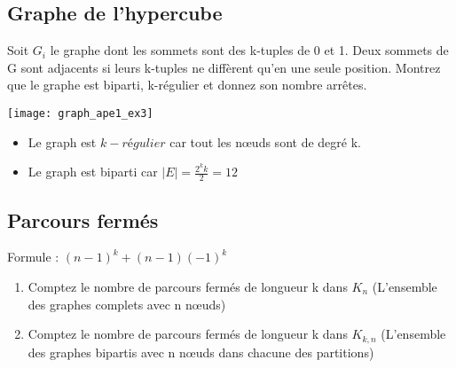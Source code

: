 \subsection{Graphe de l'hypercube}
Soit $G_{i}$ le graphe dont les sommets sont des k-tuples de 0 et 1. Deux sommets de G sont adjacents si leurs k-tuples ne diffèrent qu'en une seule position. Montrez que le graphe est biparti, k-régulier et donnez son nombre arrêtes.\\

\begin{solution}
\begin{minipage}{0.35\textwidth}
\begin{flushleft}
\texttt{[image: graph\_ape1\_ex3]}
\end{flushleft}
\end{minipage}
\begin{minipage}{0.65\textwidth}
\begin{flushright}
\begin{itemize}
\item Le graph est $k-régulier$ car tout les nœuds sont de degré k.
\item Le graph est biparti car $|E| = \frac{2^{k} k}{2} = 12$
\end{itemize}
\end{flushright}
\end{minipage}
\end{solution}

\subsection{Parcours fermés}
Formule : $(n-1)^{k} + (n-1)(-1)^{k}$
\begin{enumerate}
\item{Comptez le nombre de parcours fermés de longueur k dans $K_{n}$ (L'ensemble des graphes complets avec n nœuds)}
\item{Comptez le nombre de parcours fermés de longueur k dans $K_{k,n}$ (L'ensemble des graphes bipartis avec n nœuds dans chacune des partitions)}
\end{enumerate}

